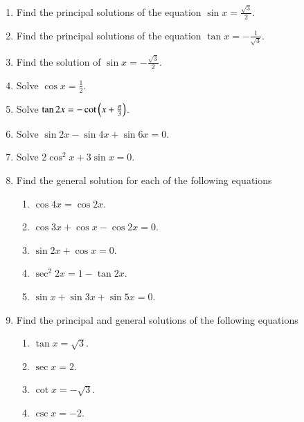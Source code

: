 \begin{enumerate}[label=\thesubsection.\arabic*,ref=\thesubsection.\theenumi]
\item Find the principal solutions of the equation $\sin x = \frac{\sqrt 3}{2}$.
%
%
\item Find the principal solutions of the equation $\tan x = -\frac{1}{\sqrt 3}$.
%
%
\item Find the solution of $\sin x = -\frac{\sqrt 3}{2}$.
%
%
\item Solve $\cos x = \frac{1}{2}$.
%
%
\item Solve $\tan2x=-\cot\left(x+\frac{\pi}{3}\right)$.
%
\item Solve $\sin2x-\sin4x+\sin6x=0$.
%
%
\item Solve 2$\cos^{2}x+3\sin x=0$.
%
\item Find the general solution for each of the following equations
\begin{enumerate}
\item $\cos4x=\cos2x$.
\item $\cos3x+\cos x-\cos2x=0$.
\item $\sin2x+\cos x=0$.
\item $\sec^{2}2x=1-\tan2x$.
\item $\sin x+\sin3x+\sin5x=0$.
\end{enumerate}
%
\item Find the principal and general solutions of the following equations
\begin{enumerate}
\item $\tan x=\sqrt 3$.
\item $\sec x=2$.
\item $\cot x=-\sqrt 3$.
\item $\csc x=-2$.
\end{enumerate}
\end{enumerate}
